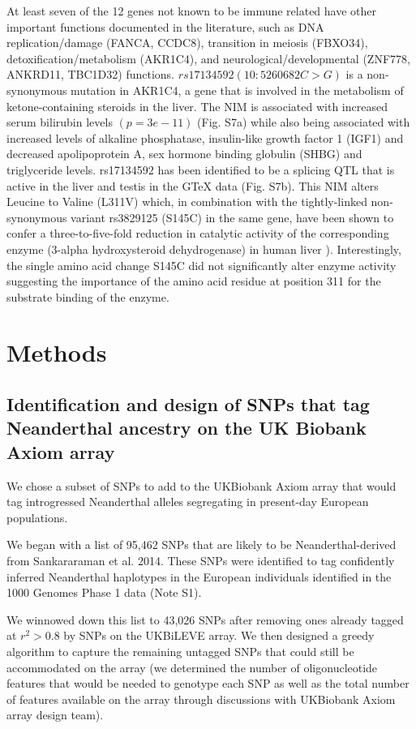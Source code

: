 At least seven of the 12 genes not known to be immune related have other important functions documented in the literature, such as DNA replication/damage (FANCA, CCDC8), transition in meiosis (FBXO34), detoxification/metabolism (AKR1C4), and neurological/developmental (ZNF778, ANKRD11, TBC1D32) functions. $rs17134592 (10:5260682 C>G)$ is a non-synonymous mutation in AKR1C4, a gene that is involved in the metabolism of ketone-containing steroids in the liver. The NIM is associated with increased serum bilirubin levels $(p = 3e-11)$  (Fig. S7a) while also being associated with increased levels of alkaline phosphatase, insulin-like growth factor 1 (IGF1) and decreased apolipoprotein A, sex hormone binding globulin (SHBG) and triglyceride levels.  rs17134592 has been identified to be a splicing QTL that is active in the liver and testis in the GTeX data (Fig. S7b). This NIM alters Leucine to Valine (L311V) which, in combination with the tightly-linked non-synonymous variant rs3829125 (S145C) in the same gene, have been shown to confer a three-to-five-fold reduction in catalytic activity of the corresponding enzyme (3-alpha hydroxysteroid dehydrogenase) in human liver \cite{kume1999characterization}). Interestingly, the single amino acid change S145C did not significantly alter enzyme activity suggesting the importance of the amino acid residue at position 311 for the substrate binding of the enzyme.
\section{Methods}
\subsection{Identification and design of SNPs that tag Neanderthal ancestry on the UK Biobank Axiom array}
We chose a subset of SNPs to add to the UKBiobank Axiom array that would tag introgressed Neanderthal alleles segregating in present-day European populations.
 
We began with a list of 95,462 SNPs that are likely to be Neanderthal-derived from Sankararaman et al. 2014. These SNPs were identified to tag confidently inferred Neanderthal haplotypes in the European individuals identified in the 1000 Genomes Phase 1 data (Note S1).

We winnowed down this list to 43,026 SNPs after removing ones already tagged at $r^2>0.8$ by SNPs on the UKBiLEVE array. We then designed a greedy algorithm to capture the remaining untagged SNPs that could still be accommodated on the array (we determined the number of oligonucleotide features that would be needed to genotype each SNP as well as the total number of features available on the array through discussions with UKBiobank Axiom array design team).

